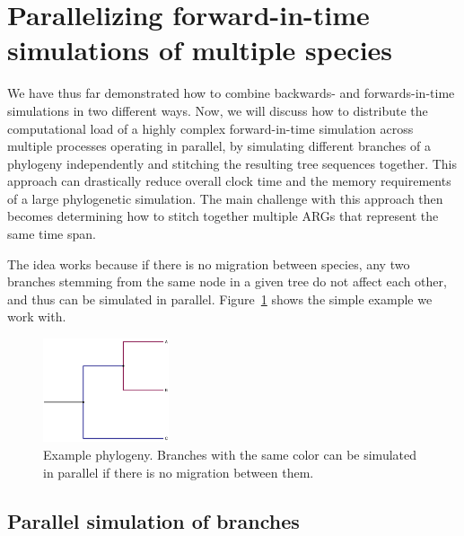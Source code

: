\documentclass[12pt]{article}
\begin{document}
\section{Parallelizing forward-in-time simulations of multiple species}

We have thus far demonstrated how to combine backwards- and forwards-in-time simulations
in two different ways.
Now, we will discuss how to distribute the computational load of a highly complex forward-in-time simulation across multiple processes operating in parallel,
by simulating different branches of a phylogeny independently
and stitching the resulting tree sequences together.
This approach can drastically reduce overall clock time and the memory requirements of a large phylogenetic simulation.
The main challenge with this approach then becomes
determining how to stitch together multiple ARGs that represent the same time span.

The idea works because if there is no migration between species,
any two branches stemming from the same node in a given tree do not affect each other,
and thus can be simulated in parallel.
Figure~\ref{fig:phylo} shows the simple example we work with.

\begin{figure}[h!]
    \centering
     \includegraphics[width=0.33\textwidth]{code/parallelizing_phylogeny/phylo.pdf}
     \caption{
         Example phylogeny.
         Branches with the same color can be simulated in parallel if there is no migration between them.
     }
     \label{fig:phylo}
\end{figure}

\subsection{Parallel simulation of branches}
\end{document}
